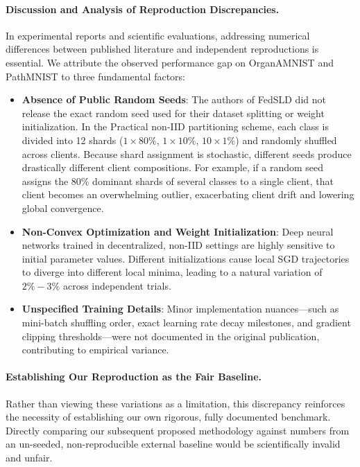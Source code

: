 \paragraph{Discussion and Analysis of Reproduction Discrepancies.}
In experimental reports and scientific evaluations, addressing numerical differences between published literature and independent reproductions is essential. We attribute the observed performance gap on OrganAMNIST and PathMNIST to three fundamental factors:
\begin{itemize}
    \item \textbf{Absence of Public Random Seeds}: The authors of FedSLD \cite{luo2022fedsld} did not release the exact random seed used for their dataset splitting or weight initialization. In the Practical non-IID partitioning scheme, each class is divided into 12 shards ($1 \times 80\%$, $1 \times 10\%$, $10 \times 1\%$) and randomly shuffled across clients. Because shard assignment is stochastic, different seeds produce drastically different client compositions. For example, if a random seed assigns the 80\% dominant shards of several classes to a single client, that client becomes an overwhelming outlier, exacerbating client drift and lowering global convergence.
    \item \textbf{Non-Convex Optimization and Weight Initialization}: Deep neural networks trained in decentralized, non-IID settings are highly sensitive to initial parameter values. Different initializations cause local SGD trajectories to diverge into different local minima, leading to a natural variation of $2\% - 3\%$ across independent trials.
    \item \textbf{Unspecified Training Details}: Minor implementation nuances—such as mini-batch shuffling order, exact learning rate decay milestones, and gradient clipping thresholds—were not documented in the original publication, contributing to empirical variance.
\end{itemize}

\paragraph{Establishing Our Reproduction as the Fair Baseline.}
Rather than viewing these variations as a limitation, this discrepancy reinforces the necessity of establishing our own rigorous, fully documented benchmark. Directly comparing our subsequent proposed methodology against numbers from an un-seeded, non-reproducible external baseline would be scientifically invalid and unfair. 

